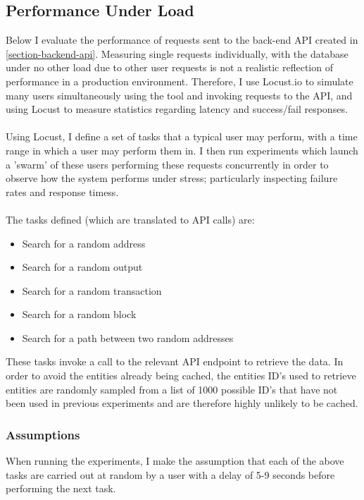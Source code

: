 \subsection{Performance Under Load}\label{evaluation:performance-under-load}
Below I evaluate the performance of requests sent to the back-end API created in \ref{section-backend-api}. Measuring single requests individually, with the database under no other load due to other user requests is not a realistic reflection of performance in a production environment. Therefore, I use Locust.io to simulate many users simultaneously using the tool and invoking requests to the API, and using Locust to measure statistics regarding latency and success/fail responses. 
\\\\
Using Locust, I define a set of tasks that a typical user may perform, with a time range in which a user may perform them in. I then run experiments which launch a 'swarm' of these users performing these requests concurrently in order to observe how the system performs under stress; particularly inspecting failure rates and response timess.
\\\\
The tasks defined (which are translated to API calls) are:
\begin{itemize}
    \item Search for a random address
    \item Search for a random output
    \item Search for a random transaction 
    \item Search for a random block
    \item Search for a path between two random addresses
\end{itemize}
These tasks invoke a call to the relevant API endpoint to retrieve the data. In order to avoid the entities already being cached, the entities ID's used to retrieve entities are randomly sampled  from a list of 1000 possible ID's that have not been used in previous experiments and are therefore highly unlikely to be cached. 

\subsubsection{Assumptions}
When running the experiments, I make the assumption that each of the above tasks are carried out at random by a user with a delay of 5-9 seconds before performing the next task. 

